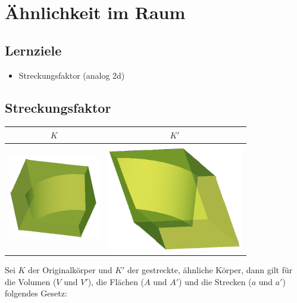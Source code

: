 \section{Ähnlichkeit im Raum}


\subsection*{Lernziele}
\begin{itemize}
\item Streckungsfaktor (analog 2d)
\end{itemize}
\newpage

\subsection{Streckungsfaktor}

\begin{tabular}{cc}
  $K$ & $K'$ \\
  \hline
  \includegraphics[width=4cm]{tals/stereo/img/aehnlich_klein.png} & \includegraphics[width=6cm]{tals/stereo/img/aehnlich_gross.png}\\

  \end{tabular} 

Sei $K$ der Originalkörper und $K'$ der gestreckte, ähnliche Körper, dann gilt
für die Volumen ($V$ und $V'$), die Flächen ($A$ und $A'$) und
die Strecken ($a$ und $a'$) folgendes Gesetz:

